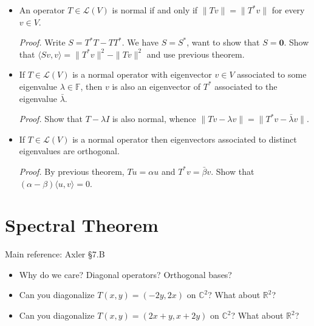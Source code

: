 \documentclass[11pt]{article}
\newcommand{\1}{\mathbf{1}}
\newcommand{\inner}[2]{\langle #1, #2 \rangle}
\newcommand{\0}{\mathbf{0}}
\newcommand{\C}{\mathbb{C}}
\newcommand{\R}{\mathbb{R}}
\begin{document}
{\begin{itemize}
\item

An operator $T\in\mathcal{L}(V)$ is normal if and only if $\|Tv\|=\|T^*v\|$ for every $v\in V$.

\emph{Proof.}
Write $S=T^*T-TT^*$. We have $S=S^*$, want to show that $S=\0$.
Show that $\inner{Sv}{v}=\|T^*v\|^2 - \|Tv\|^2$ and use previous theorem.

\item If $T\in\mathcal{L}(V)$ is a normal operator with eigenvector $v\in V$ associated to some eigenvalue $\lambda\in\mathbb{F}$, then $v$ is also an eigenvector of $T^*$ associated to the eigenvalue $\bar{\lambda}$.

\emph{Proof.}
Show that $T-\lambda I$ is also normal, whence $\|Tv-\lambda v\|=\|T^*v - \bar\lambda v\|$.

\item If $T\in\mathcal{L}(V)$ is a normal operator then eigenvectors associated to distinct eigenvalues are orthogonal.

\emph{Proof.}
By previous theorem, $Tu=\alpha u$ and $T^*v=\bar\beta v$.
Show that $(\alpha-\beta)\inner{u}{v}=0$.

\end{itemize}


\clearpage
\section{Spectral Theorem}

Main reference:
Axler \S7.B


\begin{itemize}

\item

Why do we care?
Diagonal operators?
Orthogonal bases?

%

\item

Can you diagonalize $T(x,y)=(-2y,2x)$ on $\C^2$? What about $\R^2$?

\item

Can you diagonalize $T(x,y)=(2x+y,x+2y)$ on $\C^2$? What about $\R^2$?


\end{itemize}}
\end{document}
